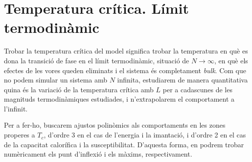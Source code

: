 \documentclass[a4paper]{article}
\begin{document}
\section{Temperatura crítica. Límit termodinàmic}

Trobar la temperatura crítica del model significa trobar la temperatura en què es dona la transició de fase en el límit termodinàmic, situació de $N \to \infty$, en què els efectes de les vores queden eliminats i el sistema és completament \textit{bulk}. Com que no podem simular un sistema amb $N$ infinita, estudiarem de manera quantitativa quina és la variació de la temperatura crítica amb $L$ per a cadascunes de les magnituds termodinàmiques estudiades, i n'extrapolarem el comportament a l'infinit.

Per a fer-ho, buscarem ajustos polinòmics als comportaments en les zones properes a $T_c$, d'ordre 3 en el cas de l'energia i la imantació, i d'ordre 2 en el cas de la capacitat calorífica i la susceptibilitat. D'aquesta forma, en podrem trobar numèricament els punt d'inflexió i els màxims, respectivament.
\end{document}
